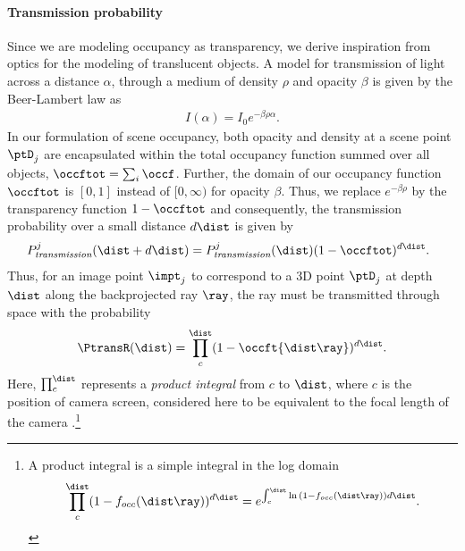 \paragraph{Transmission probability}
\label{sec:ptransmission}
Since we are modeling occupancy as transparency, we derive inspiration from optics for the modeling of translucent objects. A model for transmission of light across a distance $\alpha$, through a medium of density $\rho$ and opacity $\beta$ is given by the Beer-Lambert law as
\begin{align}
I(\alpha) = I_0 e^{-\beta\rho\alpha}.
\end{align}
%
In our formulation of scene occupancy, both opacity and density at a scene point $\ptD_j$ are encapsulated within the total occupancy function summed over all objects, $\occftot = \sum_i \occf$. Further, the domain of our occupancy function $\occftot$ is $[0, 1]$ instead of $[0, \infty)$ for opacity $\beta$. Thus, we replace $e^{-\beta\rho}$ by the transparency function $1 - \occftot$ and consequently, the transmission probability over a small distance $d\dist$ is given by
%
\begin{align}
  \!\!\!\! P^j_{\textit{transmission}}(\dist + d\dist) = P^j_{\textit{transmission}}(\dist) (1-\occftot)^{d\dist}.
\end{align}
%
Thus, for an image point $\impt_j$ to correspond to a 3D point $\ptD_j$ at depth $\dist$ along the backprojected ray $\ray$, the ray must be transmitted through space with the probability
\begin{align}
\PtransR(\dist) = \prod_{c}^{\dist} (1 - \occft{\dist \ray})^{d\dist}.
\label{eq:ptrans-integral}
\end{align}
Here, $\prod_{c}^{\dist}$ represents a \emph{product integral} from $c$ to $\dist$, where $c$ is the position of camera screen, considered here to be equivalent to the focal length of the camera .\footnote{A product integral is a simple integral in the log domain 
\vspace{-0.2cm}
\begin{equation}
\prod_{c}^{\dist} (1 - f_{occ}(\dist \ray))^{d\dist} = e^{\int_{c}^{\dist} \ln{(1 - f_{occ}(\dist \ray))}{d\dist}}. \nonumber
\end{equation}
}

